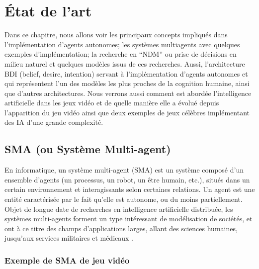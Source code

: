 
\chapter{État de l'art} %

\label{Chapter2} %

Dans ce chapitre, nous allons voir les principaux concepts impliqués dans l’implémentation d’agents autonomes; les systèmes multiagents avec quelques exemples d’implémentation; la recherche en “NDM” ou prise de décisions en milieu naturel et quelques modèles issus de ces recherches. Aussi, l’architecture BDI (belief, desire, intention) servant à l’implémentation d’agents autonomes et qui représentent l’un des modèles les plus proches de la cognition humaine, ainsi que d’autres architectures.
Nous verrons aussi comment est abordée l’intelligence artificielle dans les jeux vidéo et de quelle manière elle a évolué depuis l’apparition du jeu vidéo ainsi que deux exemples de jeux célèbres implémentant des IA d’une grande complexité.



\section{SMA (ou Système Multi-agent)}

En informatique, un système multi-agent (SMA) est un système composé d'un ensemble d'agents (un processus, un robot, un être humain, etc.), situés dans un certain environnement et interagissants selon certaines relations. Un agent est une entité caractérisée par le fait qu'elle est autonome, ou du moins partiellement.
Objet de longue date de recherches en intelligence artificielle distribuée, les systèmes multi-agents forment un type intéressant de modélisation de sociétés, et ont à ce titre des champs d'applications larges, allant des sciences humaines, jusqu’aux services militaires et médicaux \parencite{sma}.


\subsection{Exemple de SMA de jeu vidéo}

